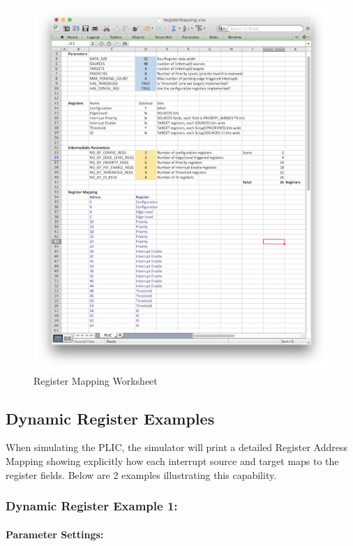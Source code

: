 \begin{figure}[!ht]
\includegraphics[width=\textwidth]{assets/img/AHB-Lite_PLIC_Worksheet.png}
\caption{Register Mapping Worksheet}
\label{fig:WORKSHEET}
\end{figure}

\clearpage

\subsection{Dynamic Register Examples}

When simulating the PLIC, the simulator will print a detailed Register Address
Mapping showing explicitly how each interrupt source and target maps to the register fields. Below are 2 examples illustrating this capability.

\subsubsection{Dynamic Register Example 1:}\label{example-1}

\paragraph{Parameter Settings:}
\ifdefined\MARKDOWN
\else
~\\
\fi

